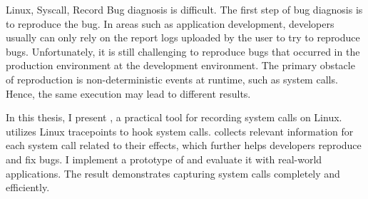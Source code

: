 
\begin{英文摘要}{Linux, Syscall, Record}
    Bug diagnosis is difficult. The first step of bug diagnosis is to reproduce the bug. In areas such as application development, developers usually can only rely on the report logs uploaded by the user to try to reproduce bugs.
    Unfortunately, it is still challenging to reproduce bugs that occurred in the production environment at the development environment. The primary obstacle of reproduction is non-deterministic events at runtime, such as system calls. Hence,  the same execution may lead to different results.

    In this thesis, I present \TheName, a practical tool for recording system calls on Linux. \TheName utilizes Linux tracepoints to hook system calls.
    \TheName collects relevant information for each system call related to their effects, which further helps developers reproduce and fix bugs. I implement a prototype of \TheName and evaluate it with real-world applications. The result demonstrates \TheName capturing system calls completely and efficiently. 
\end{英文摘要}
